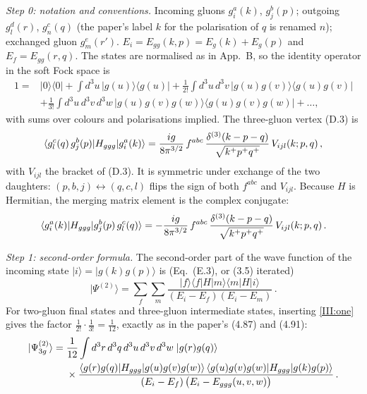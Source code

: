 \emph{Step 0: notation and conventions.} Incoming gluons $g^a_i(k)$, $g^b_j(p)$; outgoing $g^d_l(r)$, $g^c_n(q)$ (the paper's label $k$ for the polarisation of $q$ is renamed $n$); exchanged gluon $g^e_m(r')$. $E_i=E_{gg}(k,p)=E_g(k)+E_g(p)$ and $E_f=E_{gg}(r,q)$. The states are normalised as in App.~B, so the identity operator in the soft Fock space is
\begin{align}
1={}&|0\rangle\langle0|+\int\! d^3u\,|g(u)\rangle\langle g(u)|+\frac{1}{2!}\int\! d^3u\,d^3v\,|g(u)g(v)\rangle\langle g(u)g(v)|\nonumber\\
&+\frac{1}{3!}\int\! d^3u\,d^3v\,d^3w\,|g(u)g(v)g(w)\rangle\langle g(u)g(v)g(w)|+\dots,
\label{III:one}
\end{align}
with sums over colours and polarisations implied. The three-gluon vertex (D.3) is
\begin{equation}
\langle g^c_l(q)\,g^b_j(p)|H_{ggg}|g^a_i(k)\rangle=\frac{ig}{8\pi^{3/2}}\,f^{abc}\,\frac{\delta^{(3)}(k-p-q)}{\sqrt{k^+p^+q^+}}\,V_{ijl}(k;p,q)\,,
\label{III:D3}
\end{equation}
with $V_{ijl}$ the bracket of (D.3). It is symmetric under exchange of the two daughters: $(p,b,j)\leftrightarrow(q,c,l)$ flips the sign of both $f^{abc}$ and $V_{ijl}$. Because $H$ is Hermitian, the merging matrix element is the complex conjugate:
\begin{equation}
\langle g^a_i(k)|H_{ggg}|g^b_j(p)\,g^c_l(q)\rangle=-\frac{ig}{8\pi^{3/2}}\,f^{abc}\,\frac{\delta^{(3)}(k-p-q)}{\sqrt{k^+p^+q^+}}\,V_{ijl}(k;p,q)\,.
\label{III:D3m}
\end{equation}

\emph{Step 1: second-order formula.} The second-order part of the wave function of the incoming state $|i\rangle=|g(k)g(p)\rangle$ is (Eq.~(E.3), or (3.5) iterated)
\begin{equation}
|\Psi^{(2)}\rangle=\sum_f\sum_m\frac{|f\rangle\langle f|H|m\rangle\langle m|H|i\rangle}{(E_i-E_f)(E_i-E_m)}\,.
\end{equation}
For two-gluon final states and three-gluon intermediate states, inserting \eqref{III:one} gives the factor $\frac{1}{2!}\cdot\frac{1}{3!}=\frac{1}{12}$, exactly as in the paper's (4.87) and (4.91):
\begin{align}
|\Psi^{(2)}_{3g}\rangle={}&\frac{1}{12}\int d^3r\,d^3q\,d^3u\,d^3v\,d^3w\;|g(r)g(q)\rangle\nonumber\\
&\times\frac{\langle g(r)g(q)|H_{ggg}|g(u)g(v)g(w)\rangle\,\langle g(u)g(v)g(w)|H_{ggg}|g(k)g(p)\rangle}{(E_i-E_f)\,\big(E_i-E_{ggg}(u,v,w)\big)}\,.
\label{III:12}
\end{align}

